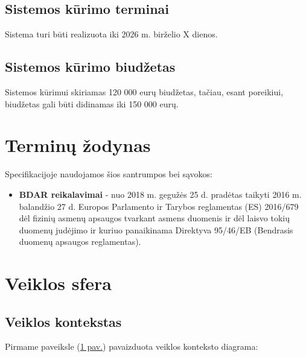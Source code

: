 \documentclass[12pt]{article}
\begin{document}
\newpage

\subsection{Sistemos kūrimo terminai}
Sistema turi būti realizuota iki 2026 m. birželio X dienos.

\subsection{Sistemos kūrimo biudžetas}
Sistemos kūrimui skiriamas 120 000 eurų biudžetas, tačiau, esant poreikiui,
biudžetas gali būti didinamas iki 150 000 eurų.

\newpage

\section{Terminų žodynas}
Specifikacijoje naudojamos šios santrumpos bei sąvokos:
\begin{itemize}
    \item \textbf{BDAR reikalavimai} - nuo 2018 m. gegužės 25 d. pradėtas
    taikyti 2016 m. balandžio 27 d. Europos Parlamento ir Tarybos reglamentas
    (ES) 2016/679 dėl fizinių asmenų apsaugos tvarkant asmens duomenis ir dėl
    laisvo tokių duomenų judėjimo ir kuriuo panaikinama Direktyva 95/46/EB
    (Bendrasis duomenų apsaugos reglamentas).
\end{itemize}

\newpage

\section{Veiklos sfera} %
\subsection{Veiklos kontekstas}
Pirmame paveiksle (\hyperref[fig:context]{1 pav.}) pavaizduota veiklos
konteksto diagrama:
\end{document}
